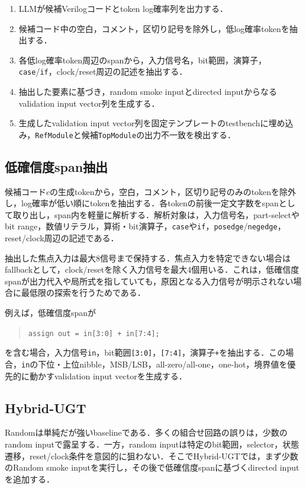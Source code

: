 \documentclass[submit,techrep,noauthor]{ipsj}
\begin{document}
\begin{enumerate}
\item LLMが候補Verilogコードとtoken log確率列を出力する．
\item 候補コード中の空白，コメント，区切り記号を除外し，低log確率tokenを抽出する．
\item 各低log確率token周辺のspanから，入力信号名，bit範囲，演算子，\texttt{case}/\texttt{if}，clock/reset周辺の記述を抽出する．
\item 抽出した要素に基づき，random smoke inputとdirected inputからなるvalidation input vector列を生成する．
\item 生成したvalidation input vector列を固定テンプレートのtestbenchに埋め込み，\texttt{RefModule}と候補\texttt{TopModule}の出力不一致を検出する．
\end{enumerate}

\subsection{低確信度span抽出}

候補コード$c$の生成tokenから，空白，コメント，区切り記号のみのtokenを除外し，log確率が低い順にtokenを抽出する．各tokenの前後一定文字数をspanとして取り出し，span内を軽量に解析する．解析対象は，入力信号名，part-selectやbit range，数値リテラル，算術・bit演算子，\texttt{case}や\texttt{if}，\texttt{posedge}/\texttt{negedge}，reset/clock周辺の記述である．

抽出した焦点入力は最大8信号まで保持する．焦点入力を特定できない場合はfallbackとして，clock/resetを除く入力信号を最大4個用いる．これは，低確信度spanが出力代入や局所式を指していても，原因となる入力信号が明示されない場合に最低限の探索を行うためである．

例えば，低確信度spanが
\begin{quote}
\small
\texttt{assign out = in[3:0] + in[7:4];}
\end{quote}
を含む場合，入力信号\texttt{in}，bit範囲\texttt{[3:0]}，\texttt{[7:4]}，演算子\texttt{+}を抽出する．この場合，\texttt{in}の下位・上位nibble，MSB/LSB，all-zero/all-one，one-hot，境界値を優先的に動かすvalidation input vectorを生成する．

\subsection{Hybrid-UGT}

Randomは単純だが強いbaselineである．多くの組合せ回路の誤りは，少数のrandom inputで露呈する．一方，random inputは特定のbit範囲，selector，状態遷移，reset/clock条件を意図的に狙わない．そこでHybrid-UGTでは，まず少数のRandom smoke inputを実行し，その後で低確信度spanに基づくdirected inputを追加する．
\end{document}
